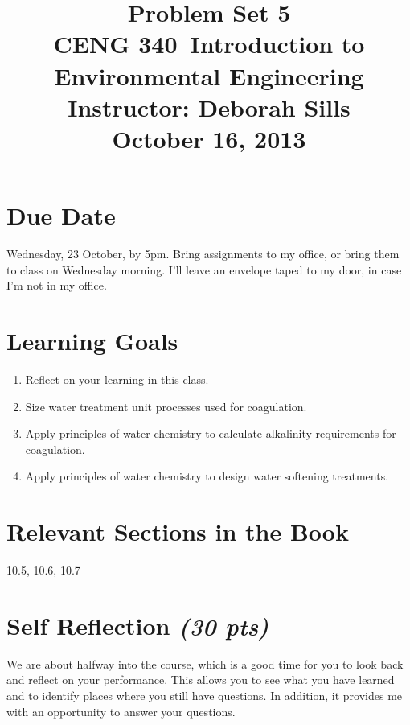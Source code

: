 \documentclass[12pt,letterpaper]{article}
\begin{document}
\setlength{\parindent}{0cm} 


\frenchspacing


\title {\Large{\textbf{Problem Set 5}}\\ \large{CENG 340--Introduction to Environmental Engineering\\
Instructor: Deborah Sills\\ \textbf{October 16, 2013}}}

\author {}
\date {}
\maketitle

\vspace{-1in}
\section *{Due Date}
Wednesday, 23 October, by 5pm.  Bring assignments to my office, or bring them to class on Wednesday morning.  I'll leave an envelope taped to my door, in case I'm not in my office.

\section *{Learning Goals}
\begin{enumerate}
\item Reflect on your learning in this class.
\item Size water treatment unit processes used for coagulation.
\item Apply principles of water chemistry to calculate alkalinity requirements for coagulation.
\item Apply principles of water chemistry to design water softening treatments.
\end{enumerate}

\section *{Relevant Sections in the Book}
10.5, 10.6, 10.7


\section *{Self Reflection \emph{(30 pts)}}

We are about halfway into the course, which is a good time for you to look back and reflect on your performance.  This allows you to see what you have learned and to identify places where you still have questions.  In addition, it provides me with an opportunity to answer your questions. 
\end{document}
